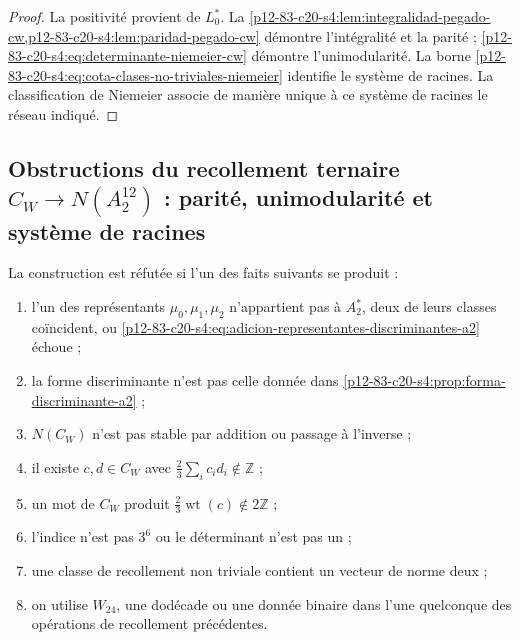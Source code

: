 \begin{proof}
La positivité provient de \(L_0^*\). La
\cref{p12-83-c20-s4:lem:integralidad-pegado-cw,p12-83-c20-s4:lem:paridad-pegado-cw} démontre
l'intégralité et la parité ; \eqref{p12-83-c20-s4:eq:determinante-niemeier-cw} démontre
l'unimodularité. La borne \eqref{p12-83-c20-s4:eq:cota-clases-no-triviales-niemeier}
identifie le système de racines. La classification de Niemeier associe de
manière unique à ce système de racines le réseau indiqué.
\end{proof}

\subsection{Obstructions du recollement ternaire \(C_W\to N(A_2^{12})\) : parité, unimodularité et système de racines}

\begin{criterion}
La construction est réfutée si l'un des faits
suivants se produit :
\begin{enumerate}
 \item l'un des représentants \(\mu_0,\mu_1,\mu_2\) n'appartient pas à
       \(A_2^*\), deux de leurs classes coïncident, ou
       \eqref{p12-83-c20-s4:eq:adicion-representantes-discriminantes-a2} échoue ;
 \item la forme discriminante n'est pas celle donnée dans
       \cref{p12-83-c20-s4:prop:forma-discriminante-a2} ;
 \item \(N(C_W)\) n'est pas stable par addition ou passage à l'inverse ;
 \item il existe \(c,d\in C_W\) avec
       \(\frac23\sum_i c_id_i\notin\mathbb Z\) ;
 \item un mot de \(C_W\) produit
       \(\frac23\operatorname{wt}(c)\notin2\mathbb Z\) ;
 \item l'indice n'est pas \(3^6\) ou le déterminant n'est pas un ;
 \item une classe de recollement non triviale contient un vecteur de norme deux ;
 \item on utilise \(W_{24}\), une dodécade ou une donnée binaire dans l'une
       quelconque des opérations de recollement précédentes.
\end{enumerate}
\end{criterion}



